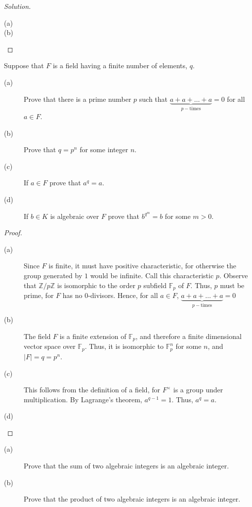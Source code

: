 \documentclass[12pt,leqno]{article}
\numberwithin{equation}{section}
\newcommand{\question}[2] {\vspace{.25in} \noindent\fbox{#1} #2 \vspace{.10in}}
\theoremstyle{definition}
\begin{document}
\begin{proof}[Solution]
 \begin{description}
  \item [(a)]
  \item [(b)]
 \end{description}

\end{proof}


\question{9}{Suppose that $F$ is a field having a finite number of elements, $q$.}
\begin{description}
 \item [(a)] Prove that there is a prime number $p$ such that $\underbrace{a+a+\hdots+a}_{p-\text{times}}=0$ for all $a\in F$.
 \item [(b)] Prove that $q=p^n$ for some integer $n$.
 \item [(c)] If $a\in F$ prove that $a^q=a$.
 \item [(d)] If $b\in K$ is algebraic over $F$ prove that $b^{q^m}=b$ for some $m>0$.
\end{description}

\begin{proof}
 \begin{description}
  \item [(a)] Since $F$ is finite, it must have positive characteristic, for otherwise the group generated by $1$ would be infinite. Call this characteristic $p$. Observe that $\mathbb{Z}/p\mathbb{Z}$ is isomorphic to the order $p$ subfield $\mathbb{F}_p$ of $F$. Thus, $p$ must be prime, for $F$ has no $0$-divisors. Hence, for all $a\in F$, $\underbrace{a+a+\hdots+a}_{p-\text{times}}=0$
  \item [(b)] The field $F$ is a finite extension of $\mathbb{F}_p$, and therefore a finite dimensional vector space over $\mathbb{F}_p$. Thus, it is isomorphic to $\mathbb{F}_p^n$ for some $n$, and $|F|=q=p^n$.
  \item [(c)] This follows from the definition of a field, for $F^{\times}$ is a group under multiplication. By Lagrange's theorem, $a^{q-1}=1$. Thus, $a^q=a$.
  \item [(d)]
 \end{description}

\end{proof}


\question{14}{ }
\begin{description}
 \item [(a)] Prove that the sum of two algebraic integers is an algebraic integer.
 \item [(b)] Prove that the product of two algebraic integers is an algebraic integer.
\end{description}
\end{document}
